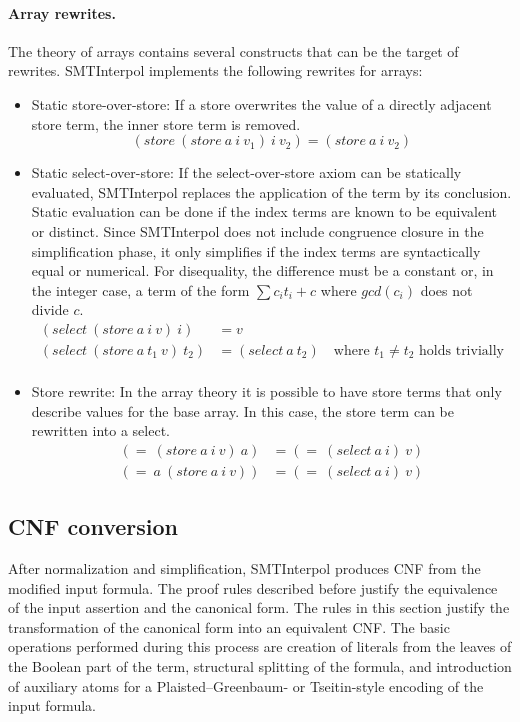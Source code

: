 \documentclass[a4paper]{article}
\newcommand\si{SMTInterpol\xspace}
\begin{document}
\paragraph{Array rewrites.}  The theory of arrays contains several constructs
that can be the target of rewrites.  \si implements the following rewrites for
arrays:
\begin{itemize}
\item Static store-over-store:  If a store overwrites the value of a directly
  adjacent store term, the inner store term is removed.
  \begin{equation}
    (store\ (store\ a\ i\ v_1)\ i\ v_2) = (store\ a\ i\ v_2)
    \tag{storeOverStore}
  \end{equation}
\item Static select-over-store: If the select-over-store axiom can be
  statically evaluated, \si replaces the application of the term by
  its conclusion.  Static evaluation can be done if the index terms
  are known to be equivalent or distinct.  Since \si does not include
  congruence closure in the simplification phase, it only simplifies
  if the index terms are syntactically equal or numerical.  For
  disequality, the difference must be a constant or, in the integer
  case, a term of the form $\sum c_it_i + c$ where $gcd(c_i)$ does not
  divide $c$.
  \begin{equation}
    \begin{aligned}
      (select\ (store\ a\ i\ v)\ i) &= v\\
      (select\ (store\ a\ t_1\ v)\ t_2) &= (select\ a\ t_2) \quad\text{where $t_1\neq t_2$ holds trivially}\\
    \end{aligned}\tag{selectOverStore}
  \end{equation}
\item Store rewrite:  In the array theory it is possible to have store terms
  that only describe values for the base array.  In this case, the store term
  can be rewritten into a select.
  \begin{equation}
    \begin{aligned}
      (=\ (store\ a\ i\ v)\ a) &= (=\ (select\ a\ i)\ v)\\
      (=\ a\ (store\ a\ i\ v)) &= (=\ (select\ a\ i)\ v)
    \end{aligned}\tag{storeRewrite}
  \end{equation}
\end{itemize}

\subsection{CNF conversion}
\label{cnflayer}
After normalization and simplification, \si produces CNF from the modified
input formula.  The proof rules described before justify the equivalence of
the input assertion and the canonical form.  The rules in this section justify
the transformation of the canonical form into an equivalent CNF.  The
basic operations performed during this process are creation of literals from
the leaves of the Boolean part of the term, structural splitting of the
formula, and introduction of auxiliary atoms for a Plaisted--Greenbaum- or
Tseitin-style encoding of the input formula.
\end{document}
